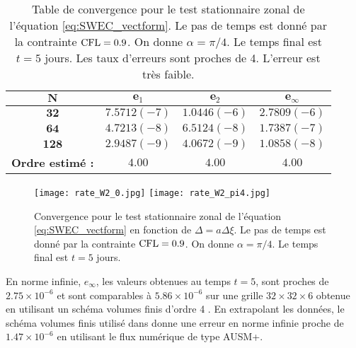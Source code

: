 \begin{table}[htbp]
\begin{center}
\begin{tabular}{|c||c|c|c|}
\hline 
$\mathbf{N}$ & $\mathbf{e}_1$ & $\mathbf{e}_2$ & $\mathbf{e}_{\infty}$ \\ 
\hline 
\hline 
$\mathbf{32}$ & $7.5712(-7)$ & $1.0446(-6)$ & $2.7809(-6)$\\ 

$\mathbf{64}$ & $4.7213(-8)$ & $6.5124(-8)$ & $1.7387(-7)$\\ 

$\mathbf{128}$ & $2.9487(-9)$ & $4.0672(-9)$ & $1.0858(-8)$\\

\hline
\textbf{Ordre estimé :} & $4.00$ & $4.00$ & $4.00$\\ 
\hline
\end{tabular} 
\end{center}
\caption{Table de convergence pour le test stationnaire zonal de l'équation \eqref{eq:SWEC_vectform}. Le pas de temps est donné par la contrainte $\text{CFL}=0.9$. On donne $\alpha = \pi/4$. Le temps final est $t=5$ jours. Les taux d'erreurs sont proches de 4. L'erreur est très faible.}
\label{tab:rate_swe2}
\end{table}

\begin{figure}[htbp]
\begin{center}
\texttt{[image: rate\_W2\_0.jpg]}
\texttt{[image: rate\_W2\_pi4.jpg]}
\end{center}
\caption{Convergence pour le test stationnaire zonal de l'équation \eqref{eq:SWEC_vectform} en fonction de $\Delta = a \Delta \xi$. Le pas de temps est donné par la contrainte $\text{CFL}=0.9$. On donne $\alpha = \pi/4$. Le temps final est $t=5$ jours.}
\label{fig:rate_swe12}
\end{figure}

En norme infinie, $e_{\infty}$, les valeurs obtenues au temps $t=5$, sont proches de $2.75 \times 10^{-6}$ et sont comparables à $5.86 \times 10^{-6}$ sur une grille $32 \times 32 \times 6$ obtenue en utilisant un schéma volumes finis d'ordre 4 \cite{Chen2008}. En extrapolant les données, le schéma volumes finis utilisé dans \cite{Ullrich2011} donne une erreur en norme infinie proche de $1.47 \times 10^{-6}$ en utilisant le flux numérique de type AUSM+.

















